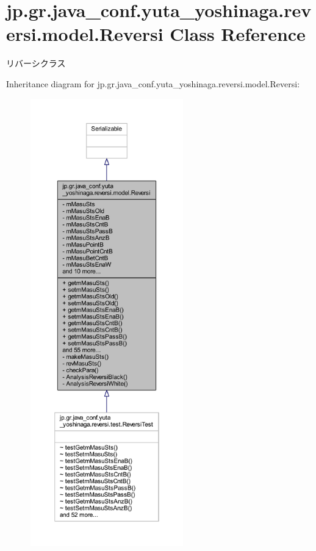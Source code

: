 \hypertarget{classjp_1_1gr_1_1java__conf_1_1yuta__yoshinaga_1_1reversi_1_1model_1_1_reversi}{}\section{jp.\+gr.\+java\+\_\+conf.\+yuta\+\_\+yoshinaga.\+reversi.\+model.\+Reversi Class Reference}
\label{classjp_1_1gr_1_1java__conf_1_1yuta__yoshinaga_1_1reversi_1_1model_1_1_reversi}


リバーシクラス  




Inheritance diagram for jp.\+gr.\+java\+\_\+conf.\+yuta\+\_\+yoshinaga.\+reversi.\+model.\+Reversi\+:
\nopagebreak
\begin{figure}[H]
\begin{center}
\leavevmode
\includegraphics[height=550pt]{classjp_1_1gr_1_1java__conf_1_1yuta__yoshinaga_1_1reversi_1_1model_1_1_reversi__inherit__graph}
\end{center}
\end{figure}


